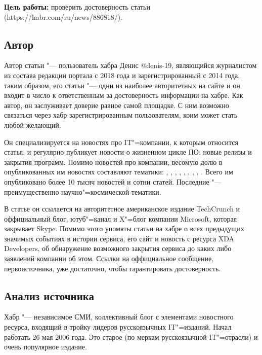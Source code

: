 \documentclass{bsuir}
\begin{document}
\maketitle
\mainmatter

\textbf{Цель работы:} проверить достоверность статьи  (https://habr.com/ru/news/886818/).

\subsection{Автор}
Автор статьи "--- пользователь хабра Денис @denis-19, являющийся журналистом из
состава редакции портала с 2018 года и зарегистрированный с 2014 года, таким
образом, его статьи "--- одни из наиболее авторитетных на сайте и он входит в
число к ответственным за достоверность информации на хабре. Как автор, он
заслуживает доверие равное самой площадке. С ним возможно связаться через хабр
зарегистрированным пользователям, коим может стать любой желающий.

Он специализируется на новостях про IT"=компании, к которым относится статья, и
регулярно публикует новости о жизненном цикле ПО: новые релизы и закрытия
программ. Помимо новостей про компании, весомую долю в опубликованных им
новостях составляют тематики: ,
, ,
, ,
, , , . Всего им опубликовано более 10 тысяч
новостей и сотни статей. Последние "--- преимущественно научно"=космической
тематики.

В статье он ссылается на авторитетное американское издание TechCrunch и
оффициальный блог, ютуб"=канал и X"=блог компании Microsoft, которая закрывает
Skype. Помимо этого упомяты статьи на хабре о всех предыдущих значимых событиях
в истории сервиса, его сайт и новость с ресурса XDA Developers, об обнаружение
возможного закрытия сервиса до каких либо заявлений компании об этом. Ссылки на
оффициальное сообщение, первоисточника, уже достаточно, чтобы гарантировать
достоверность.

\subsection{Анализ источника}
Хабр "--- независимое СМИ, коллективный блог с элементами новостного ресурса,
входящий в тройку лидеров русскоязычных IT"=изданий. Начал работать 26 мая 2006
года. Это старое (по меркам русскоязычной IT"=отрасли) и очень популярное
издание.
\end{document}
